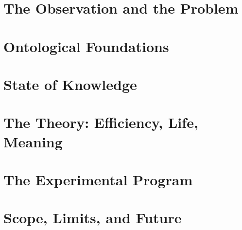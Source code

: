 \documentclass[12pt, a4paper, oneside]{book}
\begin{document}




\clearpage
\hypersetup{pageanchor=true}
\begingroup
\hypersetup{linkcolor=black}
\tableofcontents
\endgroup

\mainmatter



\part{The Observation and the Problem}



\part{Ontological Foundations}




\part{State of Knowledge}



\part{The Theory: Efficiency, Life, Meaning}




\part{The Experimental Program}





\part{Scope, Limits, and Future}



\end{document}

